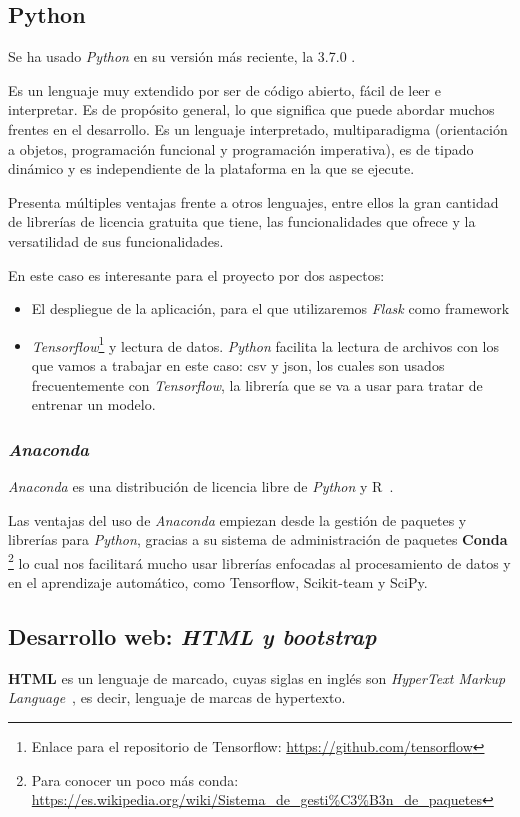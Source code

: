 \subsection{Python}
Se ha usado \textit{Python} en su versión más reciente, la 3.7.0 \cite{python}.

Es un lenguaje muy extendido por ser de código abierto, fácil de leer e interpretar.
Es de propósito general, lo que significa que puede abordar muchos frentes en el desarrollo. Es un lenguaje interpretado, multiparadigma (orientación a objetos, programación funcional y programación imperativa), es de tipado dinámico y es independiente de la plataforma en la que se ejecute.

Presenta múltiples ventajas frente a otros lenguajes, entre ellos la gran cantidad de librerías de licencia gratuita que tiene, las funcionalidades que ofrece y la versatilidad de sus funcionalidades.

En este caso es interesante para el proyecto por dos aspectos: 
\begin{itemize}
	\item El despliegue de la aplicación, para el que utilizaremos \textit{Flask} como framework 
	\item \textit{Tensorflow}\footnote{Enlace para el repositorio de Tensorflow: \url{https://github.com/tensorflow}} y lectura de datos. \textit{Python} facilita la lectura de archivos con los que vamos a trabajar en este caso: csv y json, los cuales son usados frecuentemente con \textit{Tensorflow}, la librería que se va a usar para tratar de entrenar un modelo. 
\end{itemize}
\subsubsection{\textit{Anaconda}}
\textit{Anaconda} es una distribución de licencia libre de \textit{Python} y R~\cite{ana}.

Las ventajas del uso de \textit{Anaconda} empiezan desde la gestión de paquetes y librerías para \textit{Python}, gracias a su sistema de administración de paquetes \textbf{Conda} \footnote{Para conocer un poco más conda: \url{https://es.wikipedia.org/wiki/Sistema_de_gesti\%C3\%B3n_de_paquetes}}
lo cual nos facilitará mucho usar librerías enfocadas al procesamiento de datos y en el aprendizaje automático, como Tensorflow, Scikit-team y SciPy.


\subsection{Desarrollo web: \textit{HTML y bootstrap}}
\textbf{HTML} es un lenguaje de marcado, cuyas siglas en inglés son \textit{HyperText Markup Language}~\cite{html}, es decir, lenguaje de marcas de hypertexto.

